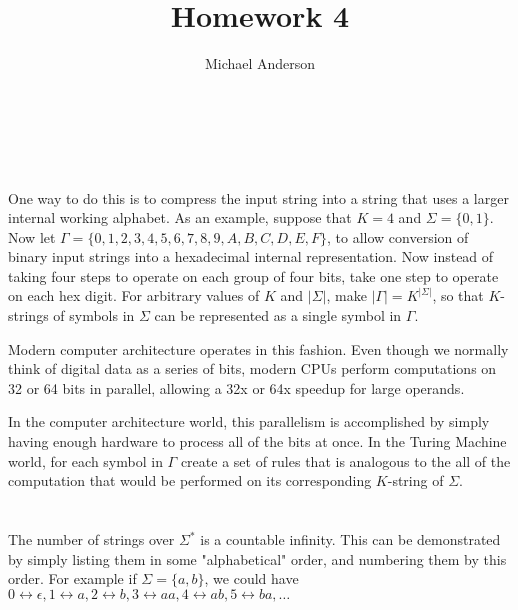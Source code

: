 \documentclass{article}
\author{Michael Anderson}
\title{Homework 4}
\begin{document}
\maketitle
{}
\\
\flushleft
\newpage

\section{}

\section{}

\section{}
One way to do this is to compress the input string into a string that uses a
larger internal working alphabet.
As an example, suppose that $K = 4$ and $\Sigma = \{0,1\}$. Now let
$\Gamma = \{0,1,2,3,4,5,6,7,8,9,A,B,C,D,E,F\}$, to allow conversion of binary
input strings into a hexadecimal internal representation. Now instead of taking
four steps to operate on each group of four bits, take one step to operate on
each hex digit. For arbitrary values of $K$ and $|\Sigma|$, make
$|\Gamma| = K^{|\Sigma|}$, so that $K$-strings of symbols in $\Sigma$ can be
represented as a single symbol in $\Gamma$. 

\vspace{1em}

Modern computer architecture operates in this fashion. Even though we normally
think of digital data as a series of bits, modern CPUs perform computations on
32 or 64 bits in parallel, allowing a 32x or 64x speedup for large operands.

\vspace{1em}

In the computer architecture world, this parallelism is accomplished by simply
having enough hardware to process all of the bits at once. In
the Turing Machine world, for each symbol in $\Gamma$ create a set of rules
that is analogous to the all of the computation that would be performed on
its corresponding $K$-string of $\Sigma$.

\section{}
The number of strings over $\Sigma^*$ is a countable infinity. This can be
demonstrated by simply listing them in some "alphabetical" order, and numbering
them by this order. For example if $\Sigma = \{a,b\}$, we could have
$0 \leftrightarrow \epsilon, 1 \leftrightarrow a, 2 \leftrightarrow b,
3 \leftrightarrow aa, 4 \leftrightarrow ab, 5 \leftrightarrow ba, \ldots$
\end{document}
